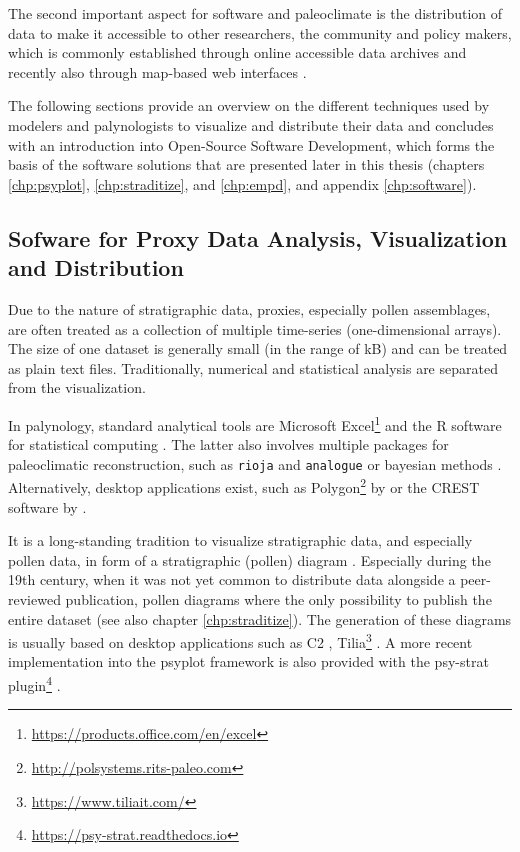 \begin{refsection}
The second important aspect for software and paleoclimate is the distribution of data to make it accessible to other researchers, the community and policy makers, which is commonly established through online accessible data archives and recently also through map-based web interfaces \citep{WilliamsGrimmBloisEtAl2018, BollietBrockmannMassonDelmotteEtAl2016}.

The following sections provide an overview on the different techniques used by modelers and palynologists to visualize and distribute their data and concludes with an introduction into Open-Source Software Development, which forms the basis of the software solutions that are presented later in this thesis (chapters \ref{chp:psyplot}, \ref{chp:straditize}, and \ref{chp:empd}, and appendix \ref{chp:software}).

\subsection{Sofware for Proxy Data Analysis, Visualization and Distribution} \label{sec:intro-software-data}

Due to the nature of stratigraphic data, proxies, especially pollen assemblages, are often treated as a collection of multiple time-series (one-dimensional arrays). The size of one dataset is generally small (in the range of kB) and can be treated as plain text files. Traditionally, numerical and statistical analysis are separated from the visualization.

In palynology, standard analytical tools are Microsoft Excel\footnote{\url{https://products.office.com/en/excel}} and the R software for statistical computing \citep{RCT2019}. The latter also involves multiple packages for paleoclimatic reconstruction, such as \texttt{rioja} \citep{Juggins2017} and \texttt{analogue} \citep{SimpsonOksanen2019, Simpson2007} or bayesian methods \citep{NolanTiptonBoothEtAl2019, Tipton2017}. Alternatively, desktop applications exist, such as Polygon\footnote{\url{http://polsystems.rits-paleo.com}} by \cite{NakagawaTarasovNishidaEtAl2002} or the CREST software by \cite{ChevalierCheddadiChase2014, Chevalier2019}.

It is a long-standing tradition to visualize stratigraphic data, and especially pollen data, in form of a stratigraphic (pollen) diagram \citep{Bradley1985, Grimm1988}. Especially during the 19th century, when it was not yet common to distribute data alongside a peer-reviewed publication, pollen diagrams where the only possibility to publish the entire dataset (see also chapter \ref{chp:straditize}). The generation of these diagrams is usually based on desktop applications such as C2 \citep{Juggins2007}, Tilia\footnote{\url{https://www.tiliait.com/}} \citep{Grimm1988, Grimm1991}. A more recent implementation into the psyplot framework \citep[chapter \ref{chp:psyplot}]{Sommer2017} is also provided with the psy-strat plugin\footnote{\url{https://psy-strat.readthedocs.io}} \citep{Sommer2019}.


\end{refsection}
